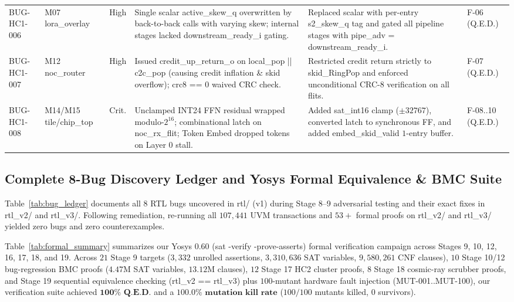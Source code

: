 \documentclass[10pt,journal,compsoc]{IEEEtran}
\def\texttt#1{#1}%
\def\textbf#1{#1}%
\begin{document}
\begin{table}[!t]
{\begin{tabular}{llcp{5.3cm}p{5.3cm}l}
\texttt{BUG-HC1-006} & \texttt{M07} \texttt{lora\_overlay} & High & Single scalar \texttt{active\_skew\_q} overwritten by back-to-back calls with varying skew; internal stages lacked \texttt{downstream\_ready\_i} gating. & Replaced scalar with per-entry \texttt{s2\_skew\_q} tag and gated all pipeline stages with \texttt{pipe\_adv = downstream\_ready\_i}. & \texttt{F-06} (\texttt{Q.E.D.}) \\
\texttt{BUG-HC1-007} & \texttt{M12} \texttt{noc\_router} & High & Issued \texttt{credit\_up\_return\_o} on \texttt{local\_pop || c2c\_pop} (causing credit inflation \& skid overflow); \texttt{crc8 == 0} waived CRC check. & Restricted credit return strictly to \texttt{skid\_RingPop} and enforced unconditional \texttt{CRC-8} verification on all flits. & \texttt{F-07} (\texttt{Q.E.D.}) \\
\texttt{BUG-HC1-008} & \texttt{M14/M15} \texttt{tile/chip\_top} & Crit. & Unclamped \texttt{INT24} FFN residual wrapped modulo-$2^{16}$; combinational latch on \texttt{noc\_rx\_flit}; Token Embed dropped tokens on Layer 0 stall. & Added \texttt{sat\_int16} clamp ($\pm 32767$), converted latch to synchronous FF, and added \texttt{embed\_skid\_valid} $1$-entry buffer. & \texttt{F-08..10} (\texttt{Q.E.D.}) \\
\bottomrule
\end{tabular}}
\end{table}

\subsection{Complete 8-Bug Discovery Ledger and Yosys Formal Equivalence \& BMC Suite}
Table~\ref{tab:bug_ledger} documents all $8$ RTL bugs uncovered in \texttt{rtl/} (\texttt{v1}) during Stage 8--9 adversarial testing and their exact fixes in \texttt{rtl\_v2/} and \texttt{rtl\_v3/}. Following remediation, re-running all $107,441$ UVM transactions and $53+$ formal proofs on \texttt{rtl\_v2/} and \texttt{rtl\_v3/} yielded \textbf{zero bugs and zero counterexamples}.

Table~\ref{tab:formal_summary} summarizes our Yosys 0.60 (\texttt{sat -verify -prove-asserts}) formal verification campaign across Stages 9, 10, 12, 16, 17, 18, and 19. Across $21$ Stage 9 targets ($3,332$ unrolled assertions, $3,310,636$ SAT variables, $9,580,261$ CNF clauses), $10$ Stage 10/12 bug-regression BMC proofs ($4.47\text{M}$ SAT variables, $13.12\text{M}$ clauses), $12$ Stage 17 HC2 cluster proofs, $8$ Stage 18 cosmic-ray scrubber proofs, and Stage 19 sequential equivalence checking (\texttt{rtl\_v2 == rtl\_v3}) plus $100$-mutant hardware fault injection (\texttt{MUT-001}..\texttt{MUT-100}), our verification suite achieved $\mathbf{100\%\text{ \texttt{Q.E.D.}}}$ and a $\mathbf{100.0\%\text{ mutation kill rate}}$ ($100/100$ mutants killed, $0$ survivors).
\end{document}
